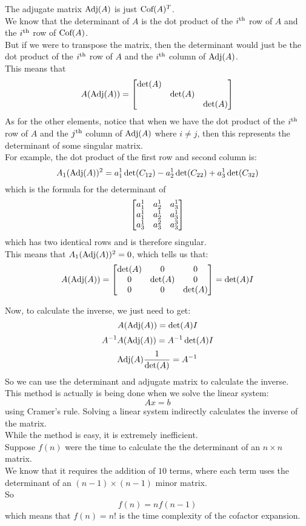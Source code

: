 \documentclass[12pt]{article}
\begin{document}
The adjugate matrix $\text{Adj}(A)$
is just $\text{Cof}(A)^T$. \\
We know that the determinant of $A$
is the dot product of the $i^{\text{th}}$
row of $A$ and the $i^{\text{th}}$ row of $\text{Cof}(A)$. \\
But if we were to transpose the matrix,
then the determinant would just be the dot
product of the $i^{\text{th}}$ row of $A$
and the $i^{\text{th}}$ column of $\text{Adj}(A)$. \\
This means that
\[ A (\text{Adj}(A)) = \begin{bmatrix} {\det(A)} & {} & {} \\
{} & {\det(A)} & {} \\ {} & { } & {\det(A)} \end{bmatrix} \]
As for the other elements,
notice that when we have the dot product of the
$i^{\text{th}}$ row of $A$
and the $j^{\text{th}}$ column of $\text{Adj}(A)$
where $i \neq j$,
then this represents the determinant of some
singular matrix. \\
For example, the dot product of the first row
and second column is:
\[ A_1(\text{Adj}(A))^2 =
a_1^1 \det(C_{12})
- a_2^1 \det(C_{22}) + a_3^1 \det(C_{32}) \]
which is the formula for the determinant of
\[ \begin{bmatrix} {a_1^1} & {a_2^1} & {a_3^1} \\
{a_1^1} & {a_2^1} & {a_3^1} \\ {a_3^1} & 
{a_3^2} & {a_3^3} \end{bmatrix} \]
which has two identical rows and is therefore
singular. \\
This means that $A_1(\text{Adj}(A))^2 = 0$,
which tells us that:
\[ A (\text{Adj}(A)) = \begin{bmatrix} {\det(A)} & {0} & {0} \\
{0} & {\det(A)} & {0} \\ {0} & {0} & {\det(A)} \end{bmatrix} 
= \det(A)I \]

Now, to calculate the inverse, we just need
to get:
\[ A (\text{Adj}(A)) = \det(A)I  \]
\[ A^{-1} A (\text{Adj}(A)) = A^{-1} \det(A)I \]
\[ \text{Adj}(A) \dfrac{1}{\det(A)} = A^{-1} \]
So we can use the determinant and adjugate matrix
to calculate the inverse. \\
This method is actually
is being done when we solve the linear
system:
\[ Ax = b \]
using Cramer's rule.
Solving a linear system indirectly
calculates the inverse of the matrix. \\

While the method is easy, it is extremely
inefficient. \\
Suppose $f(n)$ were the time to calculate the
the determinant of an $n \times n$ matrix. \\
We know that it requires the addition of $10$
terms, where each term uses the determinant
of an $(n-1) \times (n-1)$ minor matrix. \\
So
\[ f(n) = nf(n-1) \]
which means that $f(n) = n!$ is the time
complexity of the cofactor expansion. \\
\end{document}
